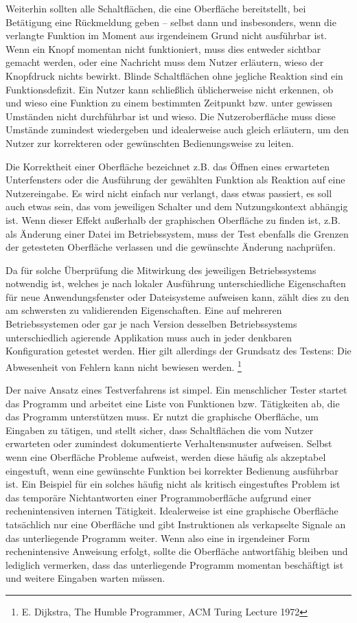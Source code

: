 Weiterhin sollten alle Schaltflächen, die eine Oberfläche bereitstellt,
bei Betätigung eine Rückmeldung geben -- selbst dann und insbesonders, wenn die verlangte
Funktion im Moment aus irgendeinem Grund nicht ausführbar ist.
Wenn ein Knopf momentan nicht funktioniert, muss dies entweder sichtbar gemacht werden,
oder eine Nachricht muss dem Nutzer erläutern, wieso der Knopfdruck nichts bewirkt.
\glqq{}Blinde\grqq{} Schaltflächen ohne jegliche Reaktion sind ein Funktionsdefizit.
Ein Nutzer kann schließlich üblicherweise nicht erkennen, ob und wieso eine Funktion
zu einem bestimmten Zeitpunkt bzw. unter gewissen Umständen nicht durchführbar ist
und wieso. Die Nutzeroberfläche muss diese Umstände zumindest wiedergeben
und idealerweise auch gleich erläutern, um den Nutzer zur korrekteren oder gewünschten
Bedienungsweise zu leiten.

Die Korrektheit einer Oberfläche bezeichnet z.B. das Öffnen eines erwarteten
Unterfensters oder die Ausführung der gewählten Funktion als Reaktion auf eine
Nutzereingabe. Es wird nicht einfach nur verlangt, dass etwas passiert, es soll
auch etwas sein, das vom jeweiligen Schalter und dem Nutzungskontext abhängig ist.
Wenn dieser Effekt außerhalb der graphischen Oberfläche zu finden ist, z.B.
als Änderung einer Datei im Betriebssystem, muss der Test ebenfalls die Grenzen
der getesteten Oberfläche verlassen und die gewünschte Änderung nachprüfen.

Da für solche Überprüfung die Mitwirkung des jeweiligen Betriebssystems notwendig
ist, welches je nach lokaler Ausführung unterschiedliche Eigenschaften für neue
Anwendungsfenster oder Dateisysteme aufweisen kann, zählt dies zu den am schwersten
zu validierenden Eigenschaften. Eine auf mehreren Betriebssystemen oder gar je
nach Version desselben Betriebssystems unterschiedlich agierende Applikation muss auch
in jeder denkbaren Konfiguration getestet werden. Hier gilt allerdings der
Grundsatz des Testens: \glqq{}Die Abwesenheit von Fehlern kann nicht bewiesen werden.\grqq{}
\footnote{E. Dijkstra, The Humble Programmer, ACM Turing Lecture 1972}

Der naive Ansatz eines Testverfahrens ist simpel. Ein menschlicher Tester startet
das Programm und arbeitet eine Liste von Funktionen bzw. Tätigkeiten ab, die das
Programm unterstützen muss. Er nutzt die graphische Oberfläche, um Eingaben zu tätigen,
und stellt sicher, dass Schaltflächen die vom Nutzer erwarteten oder zumindest
dokumentierte Verhaltensmuster aufweisen. Selbst wenn eine Oberfläche Probleme aufweist,
werden diese häufig als akzeptabel eingestuft, wenn eine gewünschte Funktion
bei korrekter Bedienung ausführbar ist. Ein Beispiel für ein solches häufig nicht als kritisch 
eingestuftes Problem ist das temporäre Nichtantworten einer Programmoberfläche
aufgrund einer rechenintensiven internen Tätigkeit. Idealerweise ist eine
graphische Oberfläche tatsächlich nur eine Oberfläche und gibt Instruktionen als
verkapselte Signale an das unterliegende Programm weiter. Wenn also eine
in irgendeiner Form rechenintensive Anweisung erfolgt, sollte die Oberfläche
antwortfähig bleiben und lediglich vermerken, dass das unterliegende Programm
momentan beschäftigt ist und weitere Eingaben warten müssen.

